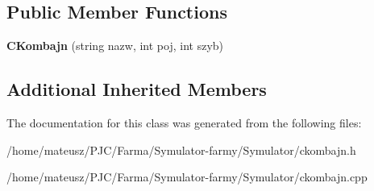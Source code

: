 \subsection*{Public Member Functions}
\begin{DoxyCompactItemize}
\item 
\mbox{\label{class_c_kombajn_ab7416ef3006fa64d2216076af85aa18d}} 
{\bfseries C\+Kombajn} (string nazw, int poj, int szyb)
\end{DoxyCompactItemize}
\subsection*{Additional Inherited Members}


The documentation for this class was generated from the following files\+:\begin{DoxyCompactItemize}
\item 
/home/mateusz/\+P\+J\+C/\+Farma/\+Symulator-\/farmy/\+Symulator/ckombajn.\+h\item 
/home/mateusz/\+P\+J\+C/\+Farma/\+Symulator-\/farmy/\+Symulator/ckombajn.\+cpp\end{DoxyCompactItemize}
